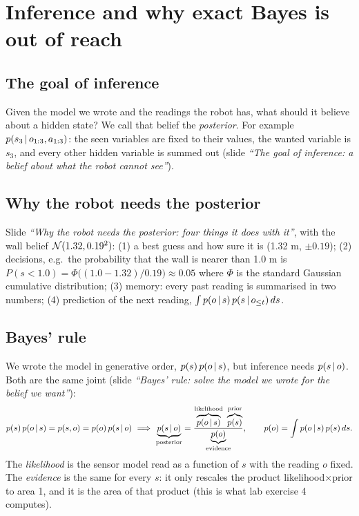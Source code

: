 \documentclass[11pt]{article}
\newcommand{\slide}[1]{\textit{``#1''}}
\begin{document}
\section{Inference and why exact Bayes is out of reach}

\subsection*{The goal of inference}
Given the model we wrote and the readings the robot has, what should it believe about a hidden state? We call that belief the \emph{posterior}. For example $p(s_3\,|\, o_{1:3},a_{1:3})$: the seen variables are fixed to their values, the wanted variable is $s_3$, and every other hidden variable is summed out (slide \slide{The goal of inference: a belief about what the robot cannot see}).

\subsection*{Why the robot needs the posterior}
Slide \slide{Why the robot needs the posterior: four things it does with it}, with the wall belief $\mathcal{N}(1.32,0.19^2)$:
(1) a best guess and how sure it is (1.32 m, $\pm0.19$); (2) decisions, e.g.\ the probability that the wall is nearer than 1.0 m is $P(s<1.0)=\Phi\big((1.0-1.32)/0.19\big)\approx0.05$ where $\Phi$ is the standard Gaussian cumulative distribution; (3) memory: every past reading is summarised in two numbers; (4) prediction of the next reading, $\int p(o\,|\, s)\,p(s\,|\, o_{\le t})\,ds$.

\subsection*{Bayes' rule}
We wrote the model in generative order, $p(s)\,p(o\,|\, s)$, but inference needs $p(s\,|\, o)$. Both are the same joint (slide \slide{Bayes' rule: solve the model we wrote for the belief we want}):
\[
p(s)\,p(o\given s)=p(s,o)=p(o)\,p(s\given o)\ \Longrightarrow\
\underbrace{p(s\given o)}_{\text{posterior}}=\frac{\overbrace{p(o\given s)}^{\text{likelihood}}\ \overbrace{p(s)}^{\text{prior}}}{\underbrace{p(o)}_{\text{evidence}}},\qquad p(o)=\int p(o\given s)\,p(s)\,ds .
\]
The \emph{likelihood} is the sensor model read as a function of $s$ with the reading $o$ fixed. The \emph{evidence} is the same for every $s$: it only rescales the product likelihood$\times$prior to area 1, and it is the area of that product (this is what lab exercise 4 computes).
\end{document}
